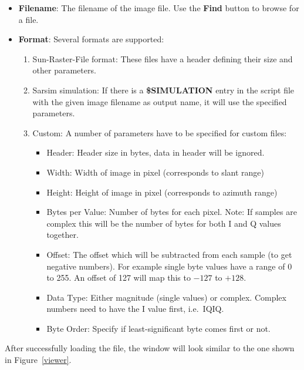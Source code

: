 \begin{itemize}
\item  \textbf{Filename}: The filename of the image file. Use the \textbf{%
Find} button to browse for a file.

\item  \textbf{Format}: Several formats are supported:

\begin{enumerate}
\item  Sun-Raster-File format: These files have a header defining their size
and other parameters.

\item  Sarsim simulation: If there is a \textbf{\$SIMULATION} entry in the
script file with the given image filename as output name, it will use the
specified parameters.

\item  Custom: A number of parameters have to be specified for custom files:

\begin{itemize}
\item  Header: Header size in bytes, data in header will be ignored.

\item  Width: Width of image in pixel (corresponds to slant range)

\item  Height: Height of image in pixel (corresponds to azimuth range)

\item  Bytes per Value: Number of bytes for each pixel. Note: If samples are
complex this will be the number of bytes for both I and Q values together.

\item  Offset: The offset which will be subtracted from each sample (to get
negative numbers). For example single byte values have a range of 0 to 255.
An offset of 127 will map this to $-127$ to $+128$.

\item  Data Type: Either magnitude (single values) or complex. Complex
numbers need to have the I value first, i.e.~IQIQ.

\item  Byte Order: Specify if least-significant byte comes first or not.
\end{itemize}
\end{enumerate}
\end{itemize}

After successfully loading the file, the window will look similar to the one
shown in Figure~\ref{viewer}.


